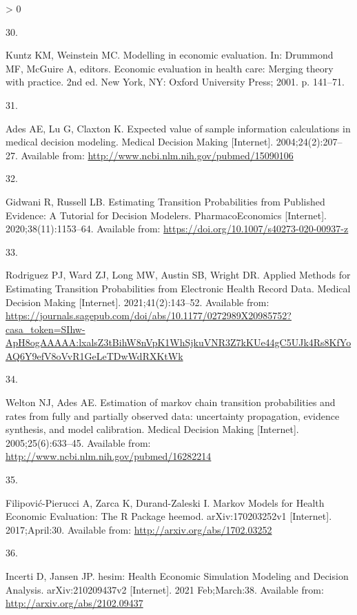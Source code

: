 \documentclass[
]{article}
\newlength{\cslhangindent}
\newlength{\csllabelwidth}
\newenvironment{CSLReferences}[2] %
 {%
  \setlength{\parindent}{0pt}
  \ifodd #1 \everypar{\setlength{\hangindent}{\cslhangindent}}\ignorespaces\fi
  \ifnum #2 > 0
  \setlength{\parskip}{#2\baselineskip}
  \fi
 }%
 {}
\newcommand{\CSLLeftMargin}[1]{\parbox[t]{\csllabelwidth}{#1}}
\newcommand{\CSLRightInline}[1]{\parbox[t]{\linewidth - \csllabelwidth}{#1}\break}
\begin{document}
\begin{CSLReferences}{0}{0}
\leavevmode\hypertarget{ref-Kuntz2001}{}%
\CSLLeftMargin{30. }
\CSLRightInline{Kuntz KM, Weinstein MC. {Modelling in economic evaluation}. In: Drummond MF, McGuire A, editors. Economic evaluation in health care: Merging theory with practice. 2nd ed. New York, NY: Oxford University Press; 2001. p. 141--71. }

\leavevmode\hypertarget{ref-Ades2004a}{}%
\CSLLeftMargin{31. }
\CSLRightInline{Ades AE, Lu G, Claxton K. {Expected value of sample information calculations in medical decision modeling.} Medical Decision Making {[}Internet{]}. 2004;24(2):207--27. Available from: \url{http://www.ncbi.nlm.nih.gov/pubmed/15090106}}

\leavevmode\hypertarget{ref-Gidwani2020}{}%
\CSLLeftMargin{32. }
\CSLRightInline{Gidwani R, Russell LB. {Estimating Transition Probabilities from Published Evidence: A Tutorial for Decision Modelers}. PharmacoEconomics {[}Internet{]}. 2020;38(11):1153--64. Available from: \url{https://doi.org/10.1007/s40273-020-00937-z}}

\leavevmode\hypertarget{ref-Rodriguez2021}{}%
\CSLLeftMargin{33. }
\CSLRightInline{Rodriguez PJ, Ward ZJ, Long MW, Austin SB, Wright DR. {Applied Methods for Estimating Transition Probabilities from Electronic Health Record Data}. Medical Decision Making {[}Internet{]}. 2021;41(2):143--52. Available from: \url{https://journals.sagepub.com/doi/abs/10.1177/0272989X20985752?casa_token=SIhw-ApH8ogAAAAA:lxalsZ3tBihW8nVpK1WhSjkuVNR3Z7kKUe44gC5UJk4Rs8KfYoAQ6Y9efV8oVvR1GeLeTDwWdRXKtWk}}

\leavevmode\hypertarget{ref-Welton2005}{}%
\CSLLeftMargin{34. }
\CSLRightInline{Welton NJ, Ades AE. {Estimation of markov chain transition probabilities and rates from fully and partially observed data: uncertainty propagation, evidence synthesis, and model calibration.} Medical Decision Making {[}Internet{]}. 2005;25(6):633--45. Available from: \url{http://www.ncbi.nlm.nih.gov/pubmed/16282214}}

\leavevmode\hypertarget{ref-Filipovic-Pierucci2017}{}%
\CSLLeftMargin{35. }
\CSLRightInline{Filipović-Pierucci A, Zarca K, Durand-Zaleski I. {Markov Models for Health Economic Evaluation: The R Package heemod}. arXiv:170203252v1 {[}Internet{]}. 2017;April:30. Available from: \url{http://arxiv.org/abs/1702.03252}}

\leavevmode\hypertarget{ref-Incerti2021}{}%
\CSLLeftMargin{36. }
\CSLRightInline{Incerti D, Jansen JP. {hesim: Health Economic Simulation Modeling and Decision Analysis}. arXiv:210209437v2 {[}Internet{]}. 2021 Feb;March:38. Available from: \url{http://arxiv.org/abs/2102.09437}}

\end{CSLReferences}
\end{document}
